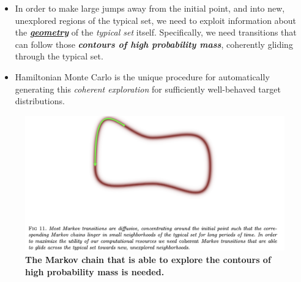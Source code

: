 \documentclass[11pt]{article}
\begin{document}
\begin{itemize}
\item In order to make large jumps away from the initial point, and into new, unexplored regions of the typical set, we need to exploit information about the \underline{\textbf{\emph{geometry}}} of the \emph{typical set} itself. Specifically, we need transitions that can follow those \emph{\textbf{contours of high probability mass}}, coherently gliding through the typical set.

\item Hamiltonian Monte Carlo is the unique procedure for automatically generating this \emph{coherent exploration} for sufficiently well-behaved target distributions.
\end{itemize}

\begin{figure}
\begin{minipage}[t]{1\linewidth}
  \centering
  \centerline{\includegraphics[scale = 0.5]{geometry_explore_typical_set.png}}
\end{minipage}
\caption{\footnotesize{\textbf{The Markov chain that is able to explore the contours of high probability mass is needed.}}}
\label{fig: geometry_explore_typical_set}
\end{figure}
\end{document}
